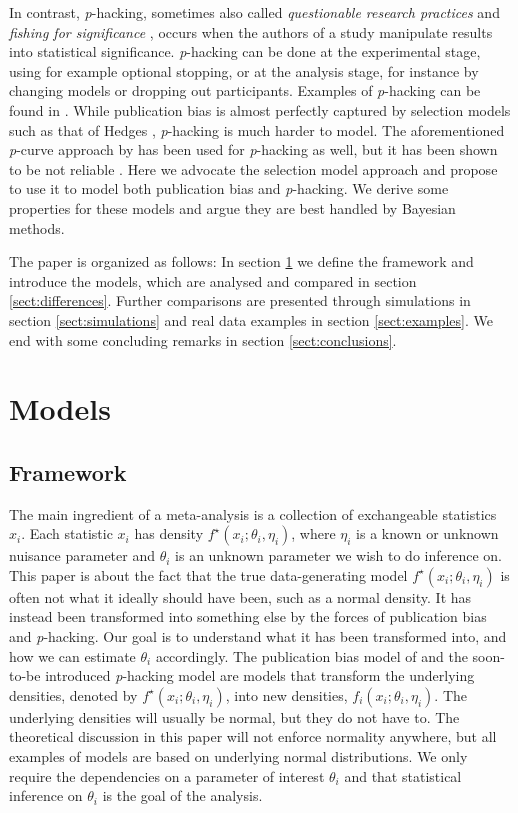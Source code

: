\documentclass[useAMS,usenatbib,referee]{biom}
\begin{document}
In contrast, \textit{p}-hacking, sometimes also called \emph{questionable research practices} \citep{Sijtsma2016} and \emph{fishing for significance} \citep{Boulesteix2009}, occurs when the authors of a study manipulate results into statistical significance. \textit{p}-hacking can be done at the experimental stage, using for example optional stopping, or at the analysis stage, for instance by changing models or dropping out participants. Examples of \textit{p}-hacking can be found in \citet{simmons2011false}. While publication bias is almost perfectly captured by selection models such as that of Hedges \citeyearpar{hedges1992modeling}, \textit{p}-hacking is much harder to model. The aforementioned \textit{p}-curve approach by \citet{simonsohn2014p} has been used for \textit{p}-hacking as well, but it has been shown to be not reliable \citep{BrunsIoannidis2016}. Here we advocate the selection model approach and propose to use it to model both publication bias and \textit{p}-hacking. We derive some properties for these models and argue they are best handled by Bayesian methods. 

The paper is organized as follows: In section \ref{sect:models} we define the framework and introduce the models, which are analysed and compared in section \ref{sect:differences}. Further comparisons are presented through simulations in section \ref{sect:simulations} and real data examples in section \ref{sect:examples}. We end with some concluding remarks in section \ref{sect:conclusions}.

\section{Models}\label{sect:models}
\subsection{Framework}
The main ingredient of a meta-analysis is a collection of exchangeable statistics $x_{i}$. Each statistic $x_{i}$ has density $f^{\star}(x_{i};\theta_{i},\eta_{i})$, where $\eta_i$ is a known or unknown nuisance parameter and $\theta_{i}$ is an unknown parameter we wish to do inference on. This paper is about the fact that the true data-generating model $f^{\star}(x_{i};\theta_{i},\eta_{i})$ is often not what it ideally should have been, such as a normal density. It has instead been transformed into something else by the forces of publication bias and \textit{p}-hacking. Our goal is to understand what it has been transformed into, and how we can estimate $\theta_{i}$ accordingly. The publication bias model of \citet{hedges1992modeling,iyengar1988selection} and the soon-to-be introduced \textit{p}-hacking model are models that transform the underlying densities, denoted by $f^{\star}(x_{i};\theta_{i},\eta_{i})$, into new densities, $f_{i}(x_{i};\theta_{i},\eta_{i})$. The underlying densities will usually be normal, but they do not have to. The theoretical discussion in this paper will not enforce normality anywhere, but all examples of models are based on underlying normal distributions. We only require the dependencies on a parameter of interest $\theta_{i}$ and that statistical inference on $\theta_{i}$ is the goal of the analysis.
\end{document}

